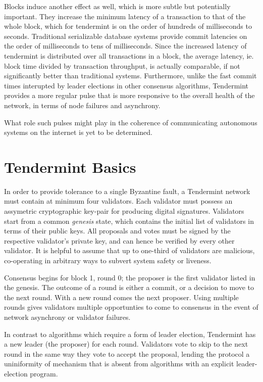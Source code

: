 Blocks induce another effect as well, which is more subtle but potentially important. 
They increase the minimum latency of a transaction to that of the whole block, which for tendermint is on the order of hundreds of milliseconds to seconds.
Traditional serializable database systems provide commit latencies on the order of milliseconds to tens of milliseconds.
Since the increased latency of tendermint is distributed over all transactions in a block, the average latency, 
ie. block time divided by transaction throughput, is actually comparable, if not significantly better than traditional systems.
Furthermore, unlike the fast commit times interupted by leader elections in other consensus algorithms,
Tendermint provides a more regular pulse that is more responsive to the overall health of the network, in terms of node failures and asynchrony.

What role such pulses might play in the coherence of communicating autonomous systems on the internet is yet to be determined.

\section{Tendermint Basics}

In order to provide tolerance to a single Byzantine fault, a Tendermint network must contain at minimum four validators.
Each validator must possess an assymetric cryptographic key-pair for producing digital signatures.
Validators start from a common \emph{genesis} state, which contains the initial list of validators in terms of their public keys.
All proposals and votes must be signed by the respective validator's private key, and can hence be verified by every other validator.
It is helpful to assume that up to one-third of validators are malicious, co-operating in arbitrary ways to subvert system safety or liveness.

Consensus begins for block 1, round 0; the proposer is the first validator listed in the genesis.
The outcome of a round is either a commit, or a decision to move to the next round.
With a new round comes the next proposer.
Using multiple rounds gives validators multiple opportunties to come to consensus in the event of network asynchrony or validator failures.

In contrast to algorithms which require a form of leader election, Tendermint has a new leader (the proposer) for each round.
Validators vote to skip to the next round in the same way they vote to accept the proposal,
lending the protocol a uniniformity of mechanism that is absent from algorithms with an explicit leader-election program.

